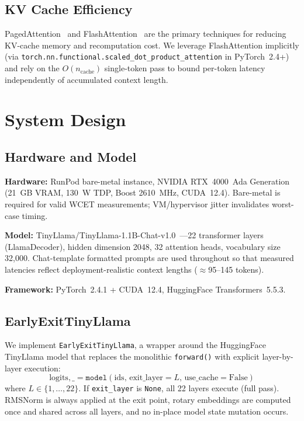 \documentclass[conference]{IEEEtran}
\begin{document}
\subsection{KV Cache Efficiency}

PagedAttention~\cite{kwon2023efficient} and FlashAttention~\cite{dao2022flashattention,dao2023flashattention2} are the primary techniques for reducing KV-cache memory and recomputation cost. We leverage FlashAttention implicitly (via \texttt{torch.nn.functional.\allowbreak scaled\_dot\_product\_attention} in PyTorch~2.4+) and rely on the $O(n_{\text{cache}})$ single-token pass to bound per-token latency independently of accumulated context length.

\section{System Design}

\subsection{Hardware and Model}

\textbf{Hardware:} RunPod bare-metal instance, NVIDIA RTX~4000~Ada Generation (21~GB VRAM, 130~W TDP, Boost 2610~MHz, CUDA~12.4). Bare-metal is required for valid WCET measurements; VM/hypervisor jitter invalidates worst-case timing.

\smallskip\noindent\textbf{Model:} TinyLlama/TinyLlama-1.1B-Chat-v1.0~\cite{zhang2024tinyllama}---22 transformer layers (LlamaDecoder), hidden dimension 2048, 32 attention heads, vocabulary size 32{,}000. Chat-template formatted prompts are used throughout so that measured latencies reflect deployment-realistic context lengths ($\approx$95--145 tokens).

\smallskip\noindent\textbf{Framework:} PyTorch~2.4.1 + CUDA~12.4, HuggingFace Transformers~5.5.3.

\subsection{EarlyExitTinyLlama}

We implement \texttt{EarlyExitTinyLlama}, a wrapper around the HuggingFace TinyLlama model that replaces the monolithic \texttt{forward()} with explicit layer-by-layer execution:
\begin{equation}
\text{logits}, \_ = \texttt{model}(\text{ids},\, \text{exit\_layer}=L,\, \text{use\_cache}=\text{False})
\end{equation}
where $L \in \{1, \ldots, 22\}$. If \texttt{exit\_layer} is \texttt{None}, all 22 layers execute (full pass). RMSNorm is always applied at the exit point, rotary embeddings are computed once and shared across all layers, and no in-place model state mutation occurs.
\end{document}
